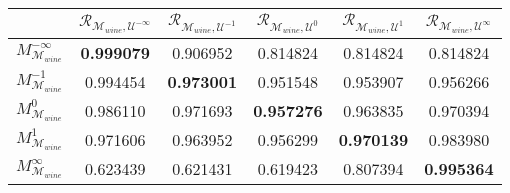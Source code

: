\begin{tabular}{|l|c|c|c|c|c|}
\toprule
\hline
 & $\mathcal{R}_{\mathcal{M}_{wine}, \mathcal{U}^{-\infty}}$ & $\mathcal{R}_{\mathcal{M}_{wine}, \mathcal{U}^{-1}}$ & $\mathcal{R}_{\mathcal{M}_{wine}, \mathcal{U}^{0}}$ & $\mathcal{R}_{\mathcal{M}_{wine}, \mathcal{U}^{1}}$ & $\mathcal{R}_{\mathcal{M}_{wine}, \mathcal{U}^{\infty}}$ \\
\hline
\midrule
$M^{-\infty}_{\mathcal{M}_{wine}}$ & \textbf{0.999079} & 0.906952 & 0.814824 & 0.814824 & 0.814824 \\
$M^{-1}_{\mathcal{M}_{wine}}$ & 0.994454 & \textbf{0.973001} & 0.951548 & 0.953907 & 0.956266 \\
$M^{0}_{\mathcal{M}_{wine}}$ & 0.986110 & 0.971693 & \textbf{0.957276} & 0.963835 & 0.970394 \\
$M^{1}_{\mathcal{M}_{wine}}$ & 0.971606 & 0.963952 & 0.956299 & \textbf{0.970139} & 0.983980 \\
$M^{\infty}_{\mathcal{M}_{wine}}$ & 0.623439 & 0.621431 & 0.619423 & 0.807394 & \textbf{0.995364} \\
\hline
\bottomrule
\end{tabular}
